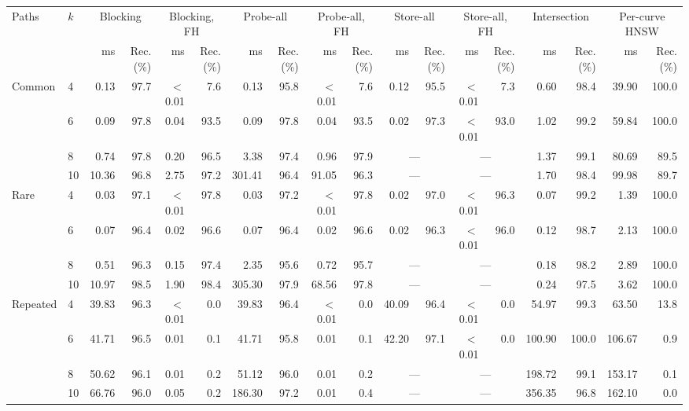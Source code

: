 \begin{tabular}{llrrrrrrrrrrrrrrrr}
\toprule
Paths & $k$ & \multicolumn{2}{c}{Blocking} & \multicolumn{2}{c}{Blocking, FH} & \multicolumn{2}{c}{Probe-all} & \multicolumn{2}{c}{Probe-all, FH} & \multicolumn{2}{c}{Store-all} & \multicolumn{2}{c}{Store-all, FH} & \multicolumn{2}{c}{Intersection} & \multicolumn{2}{c}{Per-curve HNSW}\\
\cmidrule(lr){3-4}\cmidrule(lr){5-6}\cmidrule(lr){7-8}\cmidrule(lr){9-10}\cmidrule(lr){11-12}\cmidrule(lr){13-14}\cmidrule(lr){15-16}\cmidrule(lr){17-18}
 &  & ms & Rec. (\%) & ms & Rec. (\%) & ms & Rec. (\%) & ms & Rec. (\%) & ms & Rec. (\%) & ms & Rec. (\%) & ms & Rec. (\%) & ms & Rec. (\%)\\
\midrule
Common & 4 & 0.13 & 97.7 & $<$0.01 & 7.6 & 0.13 & 95.8 & $<$0.01 & 7.6 & 0.12 & 95.5 & $<$0.01 & 7.3 & 0.60 & 98.4 & 39.90 & 100.0\\
 & 6 & 0.09 & 97.8 & 0.04 & 93.5 & 0.09 & 97.8 & 0.04 & 93.5 & 0.02 & 97.3 & $<$0.01 & 93.0 & 1.02 & 99.2 & 59.84 & 100.0\\
 & 8 & 0.74 & 97.8 & 0.20 & 96.5 & 3.38 & 97.4 & 0.96 & 97.9 & \multicolumn{2}{c}{---} & \multicolumn{2}{c}{---} & 1.37 & 99.1 & 80.69 & 89.5\\
 & 10 & 10.36 & 96.8 & 2.75 & 97.2 & 301.41 & 96.4 & 91.05 & 96.3 & \multicolumn{2}{c}{---} & \multicolumn{2}{c}{---} & 1.70 & 98.4 & 99.98 & 89.7\\\addlinespace[2pt]
Rare & 4 & 0.03 & 97.1 & $<$0.01 & 97.8 & 0.03 & 97.2 & $<$0.01 & 97.8 & 0.02 & 97.0 & $<$0.01 & 96.3 & 0.07 & 99.2 & 1.39 & 100.0\\
 & 6 & 0.07 & 96.4 & 0.02 & 96.6 & 0.07 & 96.4 & 0.02 & 96.6 & 0.02 & 96.3 & $<$0.01 & 96.0 & 0.12 & 98.7 & 2.13 & 100.0\\
 & 8 & 0.51 & 96.3 & 0.15 & 97.4 & 2.35 & 95.6 & 0.72 & 95.7 & \multicolumn{2}{c}{---} & \multicolumn{2}{c}{---} & 0.18 & 98.2 & 2.89 & 100.0\\
 & 10 & 10.97 & 98.5 & 1.90 & 98.4 & 305.30 & 97.9 & 68.56 & 97.8 & \multicolumn{2}{c}{---} & \multicolumn{2}{c}{---} & 0.24 & 97.5 & 3.62 & 100.0\\\addlinespace[2pt]
Repeated & 4 & 39.83 & 96.3 & $<$0.01 & 0.0 & 39.83 & 96.4 & $<$0.01 & 0.0 & 40.09 & 96.4 & $<$0.01 & 0.0 & 54.97 & 99.3 & 63.50 & 13.8\\
 & 6 & 41.71 & 96.5 & 0.01 & 0.1 & 41.71 & 95.8 & 0.01 & 0.1 & 42.20 & 97.1 & $<$0.01 & 0.0 & 100.90 & 100.0 & 106.67 & 0.9\\
 & 8 & 50.62 & 96.1 & 0.01 & 0.2 & 51.12 & 96.0 & 0.01 & 0.2 & \multicolumn{2}{c}{---} & \multicolumn{2}{c}{---} & 198.72 & 99.1 & 153.17 & 0.1\\
 & 10 & 66.76 & 96.0 & 0.05 & 0.2 & 186.30 & 97.2 & 0.01 & 0.4 & \multicolumn{2}{c}{---} & \multicolumn{2}{c}{---} & 356.35 & 96.8 & 162.10 & 0.0\\
\bottomrule
\end{tabular}
